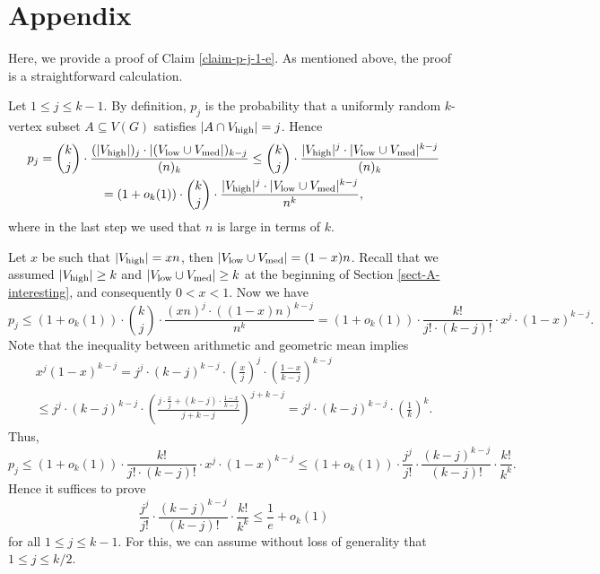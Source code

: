\appendix %
\section*{Appendix}

Here, we provide a proof of Claim \ref{claim-p-j-1-e}. As mentioned above, the proof is a straightforward calculation.

Let $1\leq j\leq k-1$. By definition, $p_j$ is the probability that a uniformly random $k$-vertex subset $A\subseteq V(G)$ satisfies $\vert A\cap V_{\textnormal{high}}\vert =j$. Hence
\begin{multline*}
p_j={k\choose j}\cdot \frac{(\vert V_{\textnormal{high}}\vert)_j\cdot \vert (V_{\textnormal{low}}\cup V_{\textnormal{med}}\vert)_{k-j}}{(n)_k}\leq {k\choose j}\cdot \frac{\vert V_{\textnormal{high}}\vert^j\cdot \vert V_{\textnormal{low}}\cup V_{\textnormal{med}}\vert^{k-j}}{(n)_k}\\
=(1+o_k(1))\cdot {k\choose j}\cdot \frac{\vert V_{\textnormal{high}}\vert^j\cdot \vert V_{\textnormal{low}}\cup V_{\textnormal{med}}\vert^{k-j}}{n^k},
\end{multline*}
where in the last step we used that $n$ is large in terms of $k$.

Let $x$ be such that $\vert V_{\textnormal{high}}\vert=xn$, then $\vert V_{\textnormal{low}}\cup V_{\textnormal{med}}\vert=(1-x)n$. Recall that we assumed $\vert V_{\textnormal{high}}\vert\geq k$ and $\vert V_{\textnormal{low}}\cup V_{\textnormal{med}}\vert\geq k$ at the beginning of Section \ref{sect-A-interesting}, and consequently $0<x<1$. Now we have
\[p_j\leq (1+o_k(1))\cdot {k\choose j}\cdot \frac{(xn)^j\cdot ((1-x)n)^{k-j}}{n^k}=(1+o_k(1))\cdot \frac{k!}{j!\cdot (k-j)!}\cdot x^{j}\cdot (1-x)^{k-j}.\]
Note that the inequality between arithmetic and geometric mean implies
\begin{multline*}
x^j(1-x)^{k-j}=j^j\cdot (k-j)^{k-j}\cdot\left(\frac{x}{j}\right)^j\cdot\left(\frac{1-x}{k-j}\right)^{k-j}\\
\leq j^j\cdot (k-j)^{k-j}\cdot\left(\frac{j\cdot \frac{x}{j}+(k-j)\cdot \frac{1-x}{k-j}}{j+k-j}\right)^{j+k-j}=j^j\cdot (k-j)^{k-j}\cdot\left(\frac{1}{k}\right)^{k}.
\end{multline*}
Thus,
\[p_j\leq (1+o_k(1))\cdot \frac{k!}{j!\cdot (k-j)!}\cdot x^{j}\cdot (1-x)^{k-j}\leq (1+o_k(1))\cdot \frac{j^j}{j!}\cdot \frac{(k-j)^{k-j}}{(k-j)!}\cdot \frac{k!}{k^k}.\]
Hence it suffices to prove
\[\frac{j^j}{j!}\cdot\frac{(k-j)^{k-j}}{(k-j)!}\cdot \frac{k!}{k^k}\leq \frac{1}{e}+o_k(1)\]
for all $1\leq j\leq k-1$. For this, we can assume without loss of generality that $1\leq j\leq k/2$.


